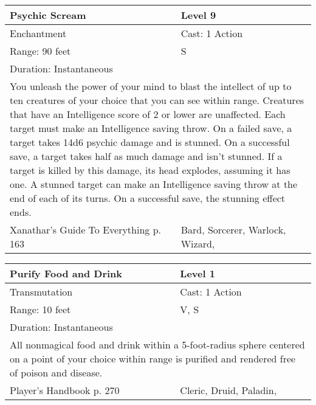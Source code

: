 \documentclass[11pt]{report}
\begin{document}
\begin{table}[H]
	\begin{tabular}{||p{6cm}|p{6cm}||}
		\hline\hline
		\bf{Psychic Scream} & Level 9\\ \hline
		Enchantment & Cast: 1 Action\\ \hline
		Range: 90 feet & S\\ \hline
		Duration: Instantaneous & \\ \hline
		\multicolumn{2}{||p{12cm}||}{You unleash the power of your mind to blast the intellect of up to ten creatures of your choice that you can see within range. Creatures that have an Intelligence score of 2 or lower are unaffected.
Each target must make an Intelligence saving throw. On a failed save, a target takes 14d6 psychic damage and is stunned. On a successful save, a target takes half as much damage and isn’t stunned. If a target is killed by this damage, its head explodes, assuming it has one.
A stunned target can make an Intelligence saving throw at the end of each of its turns. On a successful save, the stunning effect ends.}\\ \hline
Xanathar's Guide To Everything p. 163 & Bard, Sorcerer, Warlock, Wizard, \\ \hline\hline
	\end{tabular}
\end{table}

\begin{table}[H]
	\begin{tabular}{||p{6cm}|p{6cm}||}
		\hline\hline
		\bf{Purify Food and Drink} & Level 1\\ \hline
		Transmutation & Cast: 1 Action\\ \hline
		Range: 10 feet & V, S\\ \hline
		Duration: Instantaneous & \\ \hline
		\multicolumn{2}{||p{12cm}||}{All nonmagical food and drink within a 5-foot-radius sphere centered on a point of your choice within range is purified and rendered free of poison and disease.}\\ \hline
Player's Handbook p. 270 & Cleric, Druid, Paladin, \\ \hline\hline
	\end{tabular}
\end{table}
\end{document}
